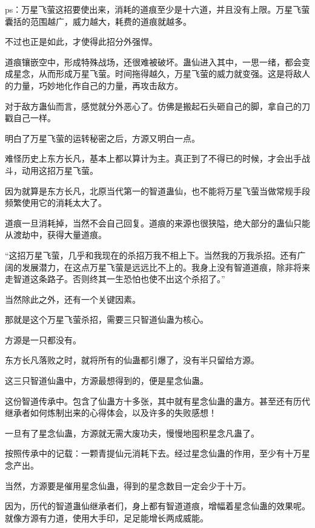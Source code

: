 
\begin{this_body}



ps：万星飞萤这招要使出来，消耗的道痕至少是十六道，并且没有上限。万星飞萤囊括的范围越广，威力越大，耗费的道痕就越多。

不过也正是如此，才使得此招分外强悍。

道痕镶嵌空中，形成特殊战场，还很难被破坏。蛊仙进入其中，一思一绪，都会变成星念，从而形成万星飞萤。时间拖得越久，万星飞萤的威力就变强。这是将敌人的力量，巧妙地化作自己的力量，再攻击敌方。

对于敌方蛊仙而言，感觉就分外恶心了。仿佛是搬起石头砸自己的脚，拿自己的刀戳自己一样。

明白了万星飞萤的运转秘密之后，方源又明白一点。

难怪历史上东方长凡，基本上都以算计为主。真正到了不得已的时候，才会出手战斗，动用这招万星飞萤。

因为就算是东方长凡，北原当代第一的智道蛊仙，也不能将万星飞萤当做常规手段频繁使用它的消耗太大了。

道痕一旦消耗掉，当然不会自己回复。道痕的来源也很狭隘，绝大部分的蛊仙只能从渡劫中，获得大量道痕。

“这招万星飞萤，几乎和我现在的杀招万我不相上下。当然我的万我杀招。还有广阔的发展潜力，在这点万星飞萤是远远比不上的。我身上没有智道道痕，除非将来走智道这条路子。否则终其一生恐怕也使不出这个杀招了。”

当然除此之外，还有一个关键因素。

那就是这个万星飞萤杀招，需要三只智道仙蛊为核心。

方源是一只都没有。

东方长凡落败之时，就将所有的仙蛊都引爆了，没有半只留给方源。

这三只智道仙蛊中，方源最想得到的，便是星念仙蛊。

这份智道传承中。包含了仙蛊方十多张，其中就有星念仙蛊的蛊方。甚至还有历代继承者如何炼制出来的心得体会，以及许多的失败感想！

一旦有了星念仙蛊，方源就无需大废功夫，慢慢地囤积星念凡蛊了。

按照传承中的记载：一颗青提仙元消耗下去。经过星念仙蛊的作用，至少有十万星念产出。

当然，方源要是催用星念仙蛊，得到的星念数目一定会少于十万。

因为，历代的智道蛊仙继承者们，身上都有智道道痕，增幅着星念仙蛊的效果呢。就像方源有力道，使用大手印，足足能增长两成威能。


\end{this_body}
